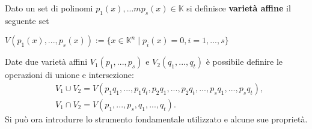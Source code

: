 \begin{defn}
	Dato un set di polinomi $p_1(x), ...m p_s(x) \in \mathbb{K}$ si definisce \textbf{varietà affine} il seguente set
	\begin{center}
		$V(p_1(x), ..., p_s(x)) := \{x \in \mathbb{K}^n  \; | \; p_i(x) = 0, i = 1, ..., s \}$
	\end{center} 
\end{defn}

Date due varietà affini $V_1(p_1, ..., p_s)$ e $V_2(q_1, ..., q_t)$ è possibile definire le operazioni di unione e intersezione:
\begin{align}
	\nonumber
	& V_1 \cup V_2 = V(p_1q_1, ...,p_1q_t, p_2q_1, ..., p_2q_t, ..., p_sq_1, ..., p_sq_t), \\
	\nonumber
	& V_1 \cap V_2 = V(p_1, ..., p_s, q_1, ..., q_t).
\end{align}
Si può ora introdurre lo strumento fondamentale utilizzato e alcune sue proprietà.
	
